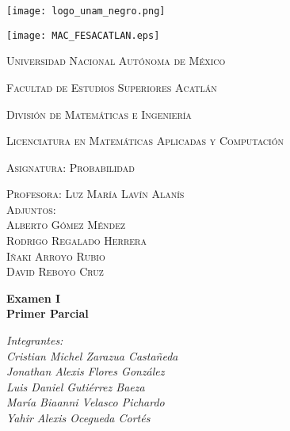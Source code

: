 \documentclass[titlepage]{article} %
\begin{document}
    \begin{titlepage}
        \centering
        
        \begin{minipage}{0.4\textwidth}
            \centering
            \texttt{[image: logo\_unam\_negro.png]}  %
        \end{minipage}%
        \hfill  %
        \begin{minipage}{0.3\textwidth}
            \centering
            \texttt{[image: MAC\_FESACATLAN.eps]}  %
        \end{minipage}

        \vspace{1cm}

        {\scshape\LARGE Universidad Nacional Autónoma de México \par}
        \vspace{0.7cm}

        {\scshape\Large Facultad de Estudios Superiores Acatlán \\ \par}
        \vspace{0.7cm}
        {\scshape\Large División de Matemáticas e Ingeniería\par}
        \vspace{0.7cm}
        {\scshape\Large Licenciatura en Matemáticas Aplicadas y Computación\par}
        \vspace{0.7cm}
        {\scshape\Large Asignatura: Probabilidad\par}
        \vspace{0.7cm}
        {\scshape\Large Profesora: Luz María Lavín Alanís\\}
        \vspace{0.7cm}
        {\scshape\Large Adjuntos:\\Alberto Gómez Méndez \\Rodrigo Regalado Herrera \\Iñaki Arroyo Rubio \\David Reboyo Cruz}
        \vspace{1.1cm}

        {\huge\bfseries Examen I \\ Primer Parcial\par}
        \vspace{1.1cm}

        {\Large\itshape Integrantes: \\ Cristian Michel Zarazua Castañeda \\
        Jonathan Alexis Flores González \\
        Luis Daniel Gutiérrez Baeza \\
        María Biaanni Velasco Pichardo \\
        Yahir Alexis Ocegueda Cortés\par}
    \end{titlepage}
    
\end{document}
